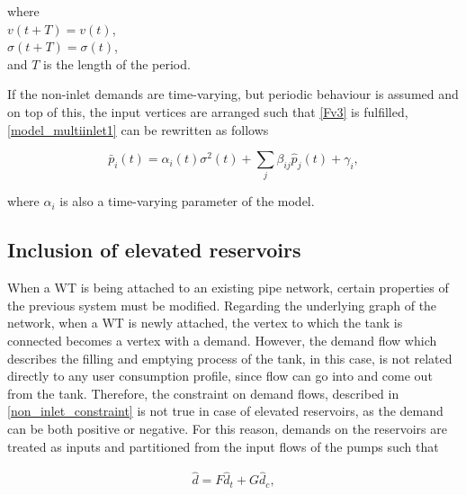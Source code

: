 \begin{minipage}[t]{0.45\textwidth}
where\\
\hspace*{8mm} $v(t+T) = v(t)$,\\
\hspace*{8mm} $\sigma(t+T) = \sigma(t)$,\\
\hspace*{8mm} and $T$ is the length of the period.
\end{minipage}

If the non-inlet demands are time-varying, but periodic behaviour is assumed and on top of this, the input vertices are arranged such that \eqref{Fv3} is fulfilled, \eqref{model_multiinlet1} can be rewritten as follows

\begin{equation}
\label{model_multiinlet1}
\bar{p}_i(t) = \alpha_i(t) \sigma^2(t) + \sum_j \beta_{ij} \hat{p}_j(t) + \gamma_i,
\end{equation}

where $\alpha_i$ is also a time-varying parameter of the model. 

\subsection{Inclusion of elevated reservoirs}
\label{inclusion_of_reservoirs}

When a WT is being attached to an existing pipe network, certain properties of the previous system must be modified. Regarding the underlying graph of the network, when a WT is newly attached, the vertex to which the tank is connected becomes a vertex with a demand. However, the demand flow which describes the filling and emptying process of the tank, in this case, is not related directly to any user consumption profile, since flow can go into and come out from the tank. Therefore, the constraint on demand flows, described in \eqref{non_inlet_constraint} is not true in case of elevated reservoirs, as the demand can be both positive or negative. For this reason, demands on the reservoirs are treated as inputs and partitioned from the input flows of the pumps such that 

\begin{equation}
\begin{split}
\label{tank_inclusion_separation_of_input_demand}
\hat{d} = F \hat{d}_t + G \hat{d}_c ,
\end{split}
\end{equation}

